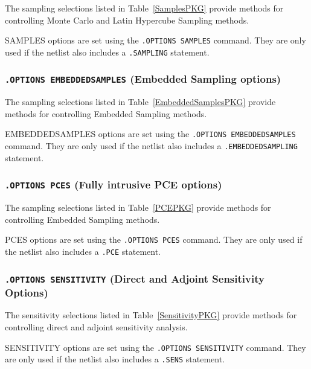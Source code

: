 The sampling selections listed in Table~\ref{SamplesPKG}
provide methods for controlling Monte Carlo and Latin Hypercube Sampling methods.

SAMPLES options are set using the \texttt{.OPTIONS SAMPLES} command. 
They are only used if the netlist also includes a \texttt{.SAMPLING} statement. 



\subsubsection{\texttt{.OPTIONS EMBEDDEDSAMPLES} (Embedded Sampling options)}

The sampling selections listed in Table~\ref{EmbeddedSamplesPKG}
provide methods for controlling Embedded Sampling methods.

EMBEDDEDSAMPLES options are set using the \texttt{.OPTIONS EMBEDDEDSAMPLES}
command.  They are only used if the
netlist also includes a \texttt{.EMBEDDEDSAMPLING} statement.



\subsubsection{\texttt{.OPTIONS PCES} (Fully intrusive PCE options)}

The sampling selections listed in Table~\ref{PCEPKG}
provide methods for controlling Embedded Sampling methods.

PCES options are set using the \texttt{.OPTIONS PCES}
command.  They are only used if the
netlist also includes a \texttt{.PCE} statement.



\subsubsection{\texttt{.OPTIONS SENSITIVITY} (Direct and Adjoint Sensitivity Options)}

The sensitivity selections listed in Table~\ref{SensitivityPKG}
provide methods for controlling direct and adjoint sensitivity analysis.

SENSITIVITY options are set using the \texttt{.OPTIONS SENSITIVITY} command. 
They are only used if the netlist also includes a \texttt{.SENS} statement. 

